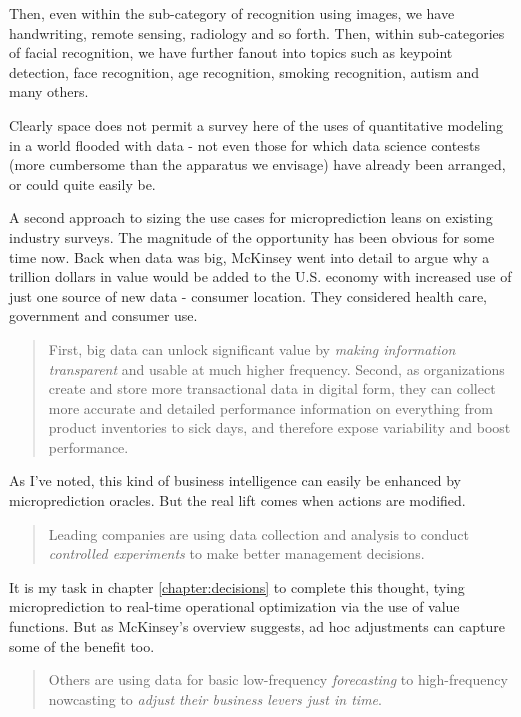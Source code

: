 Then, even within the sub-category of recognition using images, we have handwriting, remote sensing, radiology and so forth. Then, within sub-categories of facial recognition, we have further fanout into topics such as keypoint detection, face recognition, age recognition, smoking recognition, autism and many others. 

Clearly space does not permit a survey here of the uses of quantitative modeling in a world flooded with data - not even those for which data science contests (more cumbersome than the apparatus we envisage) have already been arranged, or could quite easily be. 

A second approach to sizing the use cases for microprediction leans on existing industry surveys. The magnitude of the opportunity has been obvious for some time now. Back when data was big, McKinsey went into detail to argue why a trillion dollars in value would be added to the U.S. economy with increased use of just one source of new data - consumer location.  They considered health care, government and consumer use. 
\begin{quotation}
First, big data can unlock significant value by {\em making information transparent} and usable at much higher frequency. Second, as organizations create and store more transactional data in digital form, they can collect more accurate and detailed performance information on everything from product inventories to sick days, and therefore expose variability and boost performance.
\end{quotation}
As I've noted, this kind of business intelligence can easily be enhanced by microprediction oracles. But the real lift comes when actions are modified. 
\begin{quotation}
Leading companies are using data collection and analysis to conduct {\em controlled experiments} to make better management decisions. 
\end{quotation}
It is my task in chapter \ref{chapter:decisions} to complete this thought, tying microprediction to real-time operational optimization via the use of value functions. But as McKinsey's overview suggests, ad hoc adjustments can capture some of the benefit too.  
\begin{quotation}
Others are using data for basic low-frequency {\em forecasting} to high-frequency nowcasting to {\em adjust their business levers just in time}. 
\end{quotation}
